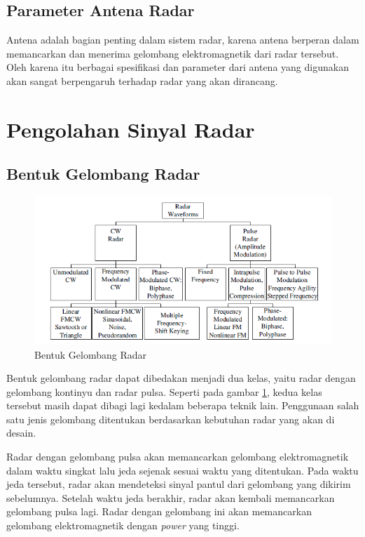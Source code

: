 \subsection{Parameter Antena Radar}
Antena adalah bagian penting dalam sistem radar, karena antena berperan dalam memancarkan dan menerima gelombang elektromagnetik dari radar tersebut. Oleh karena itu berbagai spesifikasi dan parameter dari antena yang digunakan akan sangat berpengaruh terhadap radar yang akan dirancang.

\section{Pengolahan Sinyal Radar}


\subsection{Bentuk Gelombang Radar}
\begin{figure}
	\begin{center}
		\includegraphics[scale=0.8]{pics/bab2/radarwaveform.png}
		\caption[Bentuk Gelombang Radar]{Bentuk Gelombang Radar \cite{Melvin2014}}
		\label{pic:bentukgelradar}
	\end{center}
\end{figure}
Bentuk gelombang radar dapat dibedakan menjadi dua kelas, yaitu radar dengan gelombang kontinyu dan radar pulsa. Seperti pada gambar \ref{pic:bentukgelradar}, kedua kelas tersebut masih dapat dibagi lagi kedalam beberapa teknik lain. Penggunaan salah satu jenis gelombang ditentukan berdasarkan kebutuhan radar yang akan di desain. 

Radar dengan gelombang pulsa akan memancarkan gelombang elektromagnetik dalam waktu singkat lalu jeda sejenak sesuai waktu yang ditentukan. Pada waktu jeda tersebut, radar akan mendeteksi sinyal pantul dari gelombang yang dikirim sebelumnya. Setelah waktu jeda berakhir, radar akan kembali memancarkan gelombang pulsa lagi. Radar dengan gelombang ini akan memancarkan gelombang elektromagnetik dengan \textit{power} yang tinggi. 

